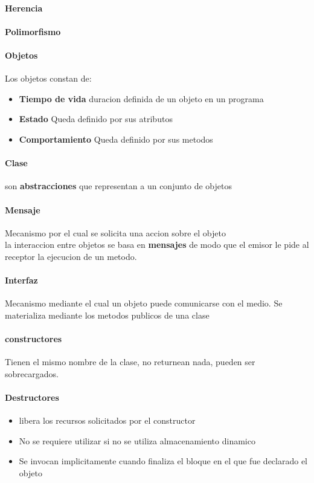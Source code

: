 \documentclass[11pt]{article}
\begin{document}
\paragraph{Herencia}
\paragraph{Polimorfismo}
\paragraph{Objetos}
Los objetos constan de:
\begin{itemize}
	\item \textbf{Tiempo de vida} duracion definida de un objeto en un programa
	\item \textbf{Estado} Queda definido por sus atributos
	\item \textbf{Comportamiento} Queda definido por sus metodos
\end{itemize}
\paragraph{Clase} son \textbf{abstracciones} que representan a un conjunto de objetos
\paragraph{Mensaje} Mecanismo por el cual se solicita una accion sobre el objeto\\
la interaccion entre objetos se basa en \textbf{mensajes} de modo que el emisor le pide al receptor la ejecucion de un metodo.
\paragraph{Interfaz} Mecanismo mediante el cual un objeto puede comunicarse con el medio. Se materializa mediante los metodos publicos de una clase
\paragraph{constructores} Tienen el mismo nombre de la clase, no returnean nada, pueden ser sobrecargados.
\paragraph{Destructores}
\begin{itemize}
	\item libera los recursos solicitados por el constructor
	\item No se requiere utilizar si no se utiliza almacenamiento dinamico
	\item Se invocan implicitamente cuando finaliza el bloque en el que fue declarado el objeto
\end{itemize}
\end{document}
